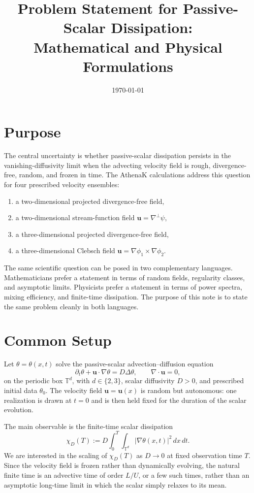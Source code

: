 \documentclass[11pt]{article}
\title{Problem Statement for Passive-Scalar Dissipation:\\
Mathematical and Physical Formulations}
\author{}
\date{\today}
\newcommand{\T}{\mathbb{T}}
\newcommand{\uu}{\mathbf{u}}
\begin{document}
\maketitle

\section{Purpose}
The central uncertainty is whether passive-scalar dissipation persists in the vanishing-diffusivity limit when the advecting velocity field is rough, divergence-free, random, and frozen in time. The AthenaK calculations address this question for four prescribed velocity ensembles:
\begin{enumerate}
\item a two-dimensional projected divergence-free field,
\item a two-dimensional stream-function field $\uu=\nabla^\perp \psi$,
\item a three-dimensional projected divergence-free field,
\item a three-dimensional Clebsch field $\uu=\nabla \phi_1\times \nabla \phi_2$.
\end{enumerate}

The same scientific question can be posed in two complementary languages. Mathematicians prefer a statement in terms of random fields, regularity classes, and asymptotic limits. Physicists prefer a statement in terms of power spectra, mixing efficiency, and finite-time dissipation. The purpose of this note is to state the same problem cleanly in both languages.

\section{Common Setup}
Let $\theta=\theta(x,t)$ solve the passive-scalar advection--diffusion equation
\begin{equation}
\partial_t \theta + \uu\cdot \nabla \theta = D\Delta \theta,
\qquad
\nabla\cdot \uu = 0,
\label{eq:scalar}
\end{equation}
on the periodic box $\T^d$, with $d\in\{2,3\}$, scalar diffusivity $D>0$, and prescribed initial data $\theta_0$. The velocity field $\uu=\uu(x)$ is random but autonomous: one realization is drawn at $t=0$ and is then held fixed for the duration of the scalar evolution.

The main observable is the finite-time scalar dissipation
\begin{equation}
\chi_D(T)
:=
D\int_0^T \int_{\T^d} |\nabla \theta(x,t)|^2\,dx\,dt.
\label{eq:chi}
\end{equation}
We are interested in the scaling of $\chi_D(T)$ as $D\to 0$ at fixed observation time $T$. Since the velocity field is frozen rather than dynamically evolving, the natural finite time is an advective time of order $L/U$, or a few such times, rather than an asymptotic long-time limit in which the scalar simply relaxes to its mean.
\end{document}

